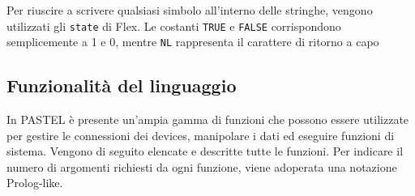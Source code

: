 \documentclass[10pt]{article}
\begin{document}
Per riuscire a scrivere qualsiasi simbolo all'interno delle stringhe, vengono utilizzati gli \texttt{state} di Flex. Le costanti \texttt{TRUE} e \texttt{FALSE} corrispondono semplicemente a 1 e 0, mentre \texttt{NL} rappresenta il carattere di ritorno a capo

\subsection{Funzionalità del linguaggio}\label{subsection:fun}
In PASTEL è presente un'ampia gamma di funzioni che possono essere utilizzate per gestire le connessioni dei devices, manipolare i dati ed eseguire funzioni di sistema. Vengono di seguito elencate e descritte tutte le funzioni. Per indicare il numero di argomenti richiesti da ogni funzione, viene adoperata una notazione Prolog-like.
\end{document}
